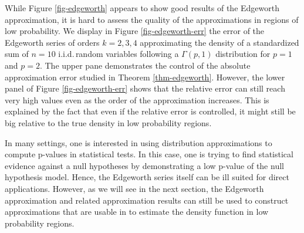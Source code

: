 \begin{example}
    While Figure \ref{fig-edgeworth} appears to show good results of the Edgeworth approximation, it is hard to assess the quality of the approximations in regions of low probability. We display in Figure \ref{fig-edgeworth-err} the error of the Edgeworth series of orders $k=2,3,4$ approximating the density of a standardized sum of $n=10$ i.i.d.\,random variables following a $\Gamma(p, 1)$ distribution for $p=1$ and $p=2$. The upper pane demonstrates the control of the absolute approximation error studied in Theorem \ref{thm-edgeworth}. However, the lower panel of Figure \ref{fig-edgeworth-err} shows that the relative error can still reach very high values even as the order of the approximation increases. This is explained by the fact that even if the relative error is controlled, it might still be big relative to the true density in low probability regions.

    In many settings, one is interested in using distribution approximations to compute p-values in statistical tests. In this case, one is trying to find statistical evidence against a null hypotheses by demonstrating a low p-value of the null hypothesis model. Hence, the Edgeworth series itself can be ill suited for direct applications. However, as we will see in the next section, the Edgeworth approximation and related approximation results can still be used to construct approximations that are usable in to estimate the density function in low probability regions.
\end{example}